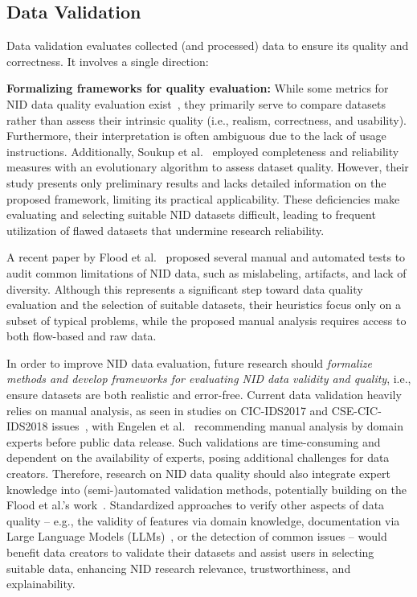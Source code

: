 \subsection{Data Validation}

Data validation evaluates collected (and processed) data to ensure its quality and correctness. It involves a single direction:

\textbf{Formalizing frameworks for quality evaluation:} While some metrics for NID data quality evaluation exist~\cite{gharib2016_evaluation_framework_ids_data,haider2017_ngids_ds_dataset}, they primarily serve to compare datasets rather than assess their intrinsic quality (i.e., realism, correctness, and usability). Furthermore, their interpretation is often ambiguous due to the lack of usage instructions. Additionally, Soukup et al.~\cite{soukup2021_towards_nids_data_quality_eval} employed completeness and reliability measures with an evolutionary algorithm to assess dataset quality. However, their study presents only preliminary results and lacks detailed information on the proposed framework, limiting its practical applicability. These deficiencies make evaluating and selecting suitable NID datasets difficult, leading to frequent utilization of flawed datasets that undermine research reliability.

A recent paper by Flood et al.~\cite{flood2024_bad_design_smells_nids_datasets} proposed several manual and automated tests to audit common limitations of NID data, such as mislabeling, artifacts, and lack of diversity. Although this represents a significant step toward data quality evaluation and the selection of suitable datasets, their heuristics focus only on a subset of typical problems, while the proposed manual analysis requires access to both flow-based and raw data.

In order to improve NID data evaluation, future research should \emph{formalize methods and develop frameworks for evaluating NID data validity and quality}, i.e., ensure datasets are both realistic and error-free. Current data validation heavily relies on manual analysis, as seen in studies on CIC-IDS2017 and CSE-CIC-IDS2018 issues~\cite{engelen2021_cicids2017_troubleshooting, liu2022_error_prevalence_nids_data, lanvin2023_errors_cicids2017}, with Engelen et al.~\cite{engelen2022_pillars_of_sand} recommending manual analysis by domain experts before public data release. Such validations are time-consuming and dependent on the availability of experts, posing additional challenges for data creators. Therefore, research on NID data quality should also integrate expert knowledge into (semi-)automated validation methods, potentially building on the Flood et al.'s work~\cite{flood2024_bad_design_smells_nids_datasets}. Standardized approaches to verify other aspects of data quality -- e.g., the validity of features via domain knowledge, documentation via Large Language Models (LLMs)~\cite{ginermiguelez2024_llms_enrich_docs_datasets}, or the detection of common issues -- would benefit data creators to validate their datasets and assist users in selecting suitable data, enhancing NID research relevance, trustworthiness, and explainability.

